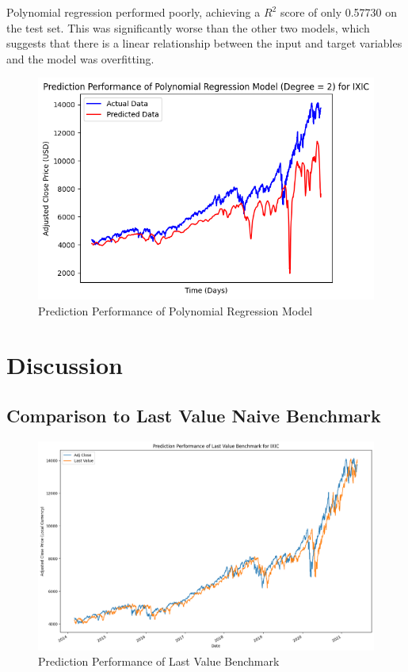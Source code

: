 \documentclass[a4paper, 11pt]{article}
\begin{document}
Polynomial regression performed poorly, achieving a $R^2$ score of only 0.57730 on the test set. This was significantly worse than the other two models, which suggests that there is a linear relationship between the input and target variables and the model was overfitting.

\begin{figure}[H]
    \begin{center}
        \includegraphics[width=1\textwidth]{Prediction Performance of Polynomial Regression Model.png}
        \caption{Prediction Performance of Polynomial Regression Model}
    \end{center}
\end{figure}

\section{Discussion}

\subsection{Comparison to Last Value Naive Benchmark}
\begin{figure}[H]
    \begin{center}
        \includegraphics[width=1\textwidth]{Prediction Performance of Last Value Benchmark.png}
        \caption{Prediction Performance of Last Value Benchmark}
    \end{center}
\end{figure}
\end{document}
